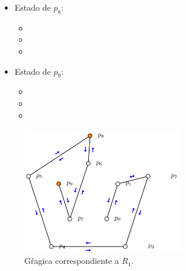 \begin{multicols}{2}
\begin{itemize}
\begin{itemize}
      \item {}
      
      \item {}
      \end{itemize}

\item Estado de $p_8$:
      \begin{itemize}
      \item {}
      
      \item {}
      
      \item {}
      \end{itemize}

\item Estado de $p_9$:
      \begin{itemize}
      \item {}
      
      \item {}
      
      \item {}
      \end{itemize}

\end{itemize}
\end{multicols} 
\newpage

\begin{figure}[ht]
        \begin{center}
                \includegraphics[width=7cm]{RD1.png}
                \caption{Gŕagica correspondiente a $R_1$.}
        \end{center}
\end{figure}

